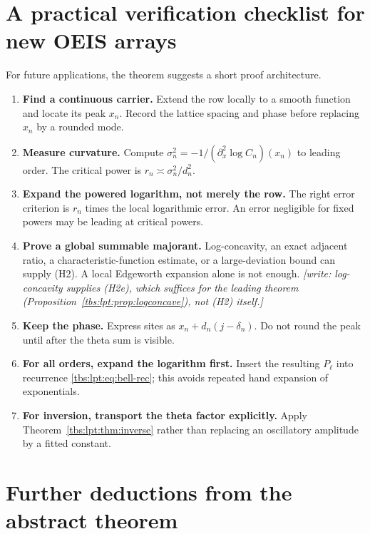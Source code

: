 \documentclass[11pt,a4paper]{article}
\numberwithin{equation}{section}
\theoremstyle{definition}
\begin{document}
\section{A practical verification checklist for new OEIS arrays}\label{tbs:lpt:sec:checklist}

For future applications, the theorem suggests a short proof architecture.
\begin{enumerate}[label=\textbf{Step \arabic*.},leftmargin=*]
\item \textbf{Find a continuous carrier.} Extend the row locally to a
smooth function and locate its peak $x_n$. Record the lattice spacing and
phase before replacing $x_n$ by a rounded mode.
\item \textbf{Measure curvature.} Compute
$\sigma_n^2=-1/(\partial_x^2\log C_n)(x_n)$ to leading order. The
critical power is $r_n\asymp\sigma_n^2/d_n^2$.
\item \textbf{Expand the powered logarithm, not merely the row.} The
right error criterion is $r_n$ times the local logarithmic error. An
error negligible for fixed powers may be leading at critical powers.
\item \textbf{Prove a global summable majorant.} Log-concavity, an exact
adjacent ratio, a characteristic-function estimate, or a large-deviation
bound can supply (H2). A local Edgeworth expansion alone is not enough.
\emph{[write: log-concavity supplies (H2e), which suffices for the
leading theorem (Proposition~\ref{tbs:lpt:prop:logconcave}), not (H2)
itself.]}
\item \textbf{Keep the phase.} Express sites as $x_n+d_n(j-\delta_n)$. Do
not round the peak until after the theta sum is visible.
\item \textbf{For all orders, expand the logarithm first.} Insert the
resulting $P_\ell$ into recurrence \eqref{tbs:lpt:eq:bell-rec}; this
avoids repeated hand expansion of exponentials.
\item \textbf{For inversion, transport the theta factor explicitly.}
Apply Theorem~\ref{tbs:lpt:thm:inverse} rather than replacing an
oscillatory amplitude by a fitted constant.
\end{enumerate}

\section{Further deductions from the abstract theorem}\label{tbs:lpt:sec:deductions}
\end{document}
